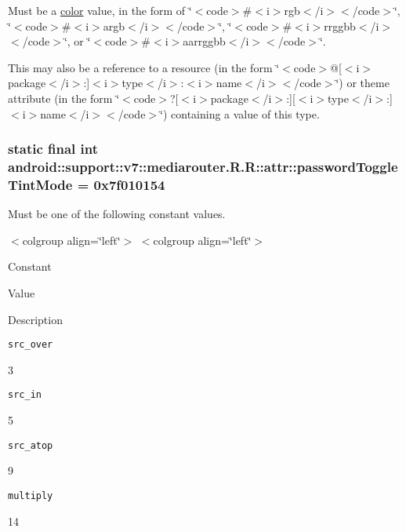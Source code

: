 Must be a \hyperlink{classandroid_1_1support_1_1v7_1_1mediarouter_1_1_r_1_1color}{color} value, in the form of \char`\"{}$<$code$>$\#$<$i$>$rgb$<$/i$>$$<$/code$>$\char`\"{}, \char`\"{}$<$code$>$\#$<$i$>$argb$<$/i$>$$<$/code$>$\char`\"{}, \char`\"{}$<$code$>$\#$<$i$>$rrggbb$<$/i$>$$<$/code$>$\char`\"{}, or \char`\"{}$<$code$>$\#$<$i$>$aarrggbb$<$/i$>$$<$/code$>$\char`\"{}. 

This may also be a reference to a resource (in the form \char`\"{}$<$code$>$@\mbox{[}$<$i$>$package$<$/i$>$:\mbox{]}$<$i$>$type$<$/i$>$:$<$i$>$name$<$/i$>$$<$/code$>$\char`\"{}) or theme attribute (in the form \char`\"{}$<$code$>$?\mbox{[}$<$i$>$package$<$/i$>$:\mbox{]}\mbox{[}$<$i$>$type$<$/i$>$:\mbox{]}$<$i$>$name$<$/i$>$$<$/code$>$\char`\"{}) containing a value of this type. \hypertarget{classandroid_1_1support_1_1v7_1_1mediarouter_1_1_r_1_1attr_659c52155b8c2f20ee7eded305ee22af}{
\subsubsection[{passwordToggleTintMode}]{\setlength{\rightskip}{0pt plus 5cm}static final int android::support::v7::mediarouter.R.R::attr::passwordToggleTintMode = 0x7f010154}}
\label{classandroid_1_1support_1_1v7_1_1mediarouter_1_1_r_1_1attr_659c52155b8c2f20ee7eded305ee22af}


Must be one of the following constant values. \begin{TabularC}{0}
\hline
\end{TabularC}
$<$colgroup align=\char`\"{}left\char`\"{}$>$ $<$colgroup align=\char`\"{}left\char`\"{}$>$ 

Constant

Value

Description 

{\tt src\_\-over}

3

{\tt src\_\-in}

5

{\tt src\_\-atop}

9

{\tt multiply}

14

